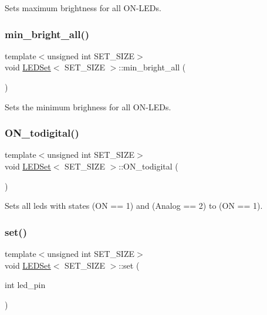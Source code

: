 Sets maximum brightness for all O\+N-\/\+L\+E\+Ds. 

\mbox{\label{classLEDSet_a9479e36e91b5b1387cfc27722a4a6007}} 
\subsubsection{\texorpdfstring{min\+\_\+bright\+\_\+all()}{min\_bright\_all()}}
{\footnotesize\ttfamily template$<$unsigned int S\+E\+T\+\_\+\+S\+I\+ZE$>$ \\
void \hyperlink{classLEDSet}{L\+E\+D\+Set}$<$ S\+E\+T\+\_\+\+S\+I\+ZE $>$\+::min\+\_\+bright\+\_\+all (\begin{DoxyParamCaption}{ }\end{DoxyParamCaption})\hspace{0.3cm}{\ttfamily [inline]}}

Sets the minimum brighness for all O\+N-\/\+L\+E\+Ds. \mbox{\label{classLEDSet_a141bb664e7f58ae676455972ca9cd686}} 
\subsubsection{\texorpdfstring{O\+N\+\_\+todigital()}{ON\_todigital()}}
{\footnotesize\ttfamily template$<$unsigned int S\+E\+T\+\_\+\+S\+I\+ZE$>$ \\
void \hyperlink{classLEDSet}{L\+E\+D\+Set}$<$ S\+E\+T\+\_\+\+S\+I\+ZE $>$\+::O\+N\+\_\+todigital (\begin{DoxyParamCaption}{ }\end{DoxyParamCaption})\hspace{0.3cm}{\ttfamily [inline]}}



Sets all leds with states (ON == 1) and (Analog == 2) to (ON == 1). 

\mbox{\label{classLEDSet_a8f5431c0b3c059c43353cf7e3d02ca62}} 
\subsubsection{\texorpdfstring{set()}{set()}\hspace{0.1cm}{\footnotesize\ttfamily [1/3]}}
{\footnotesize\ttfamily template$<$unsigned int S\+E\+T\+\_\+\+S\+I\+ZE$>$ \\
void \hyperlink{classLEDSet}{L\+E\+D\+Set}$<$ S\+E\+T\+\_\+\+S\+I\+ZE $>$\+::set (\begin{DoxyParamCaption}\item[{int}]{led\+\_\+pin }\end{DoxyParamCaption})\hspace{0.3cm}{\ttfamily [inline]}}



